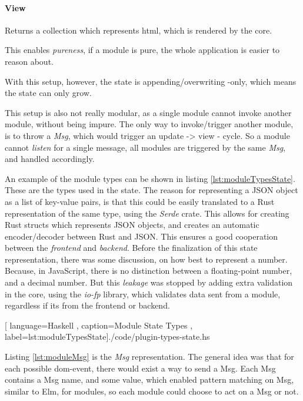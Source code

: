 \paragraph{View} Returns a collection which represents \gls{html},
which is rendered by the core.

This enables \textit{pureness}, if a module is pure, the whole application is
easier to reason about.

With this setup, however, the state is appending/overwriting -only, which means
the state can only grow.

This setup is also not really modular, as a single module cannot invoke another
module, without being impure. The only way to invoke/trigger another module, is
to throw a \textit{Msg}, which would trigger an update -> view - cycle. So
a module cannot \textit{listen} for a single message, all modules are triggered
by the same \textit{Msg}, and handled accordingly.

An example of the module types can be shown in listing
\ref{lst:moduleTypesState}. These are the types used in the state. The reason
for representing a JSON object as a list of key-value pairs, is that this could
be easily translated to a Rust representation of the same type, using the
\textit{Serde} crate. This allows for creating Rust structs which represents
JSON objects, and creates an automatic encoder/decoder between Rust and JSON.
This ensures a good cooperation between the \textit{frontend} and
\textit{backend}.
Before the finalization of this state representation, there was some
discussion, on how best to represent a number. Because, in JavaScript, there is
no distinction between a floating-point number, and a decimal number. But this
\textit{leakage} was stopped by adding extra validation in the core, using the
\textit{io-fp} library, which validates data sent from a module, regardless if
its from the frontend or backend.

\begin{center}
  
    [ language=Haskell
    , caption={Module State Types}
    , label=lst:moduleTypesState]{./code/plugin-types-state.hs}
\end{center}

Listing \ref{lst:moduleMsg} is the \textit{Msg} representation. The general idea
was that for each possible \gls{dom}-event, there would exist a way to send a
Msg. Each Msg contains a Msg name, and some value, which enabled pattern
matching on Msg, similar to Elm, for modules, so each module could choose to act
on a Msg or not.

